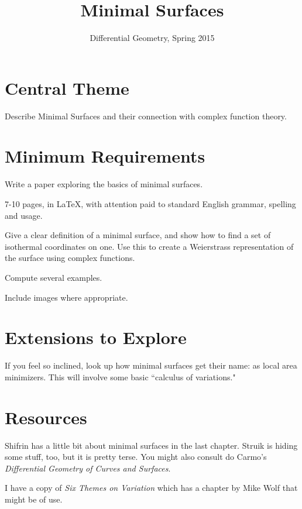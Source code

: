 \documentclass[12pt]{amsart}
\begin{document}
\title{Minimal Surfaces}
\author{Differential Geometry, Spring 2015}

\maketitle

\section*{Central Theme}

Describe Minimal Surfaces and their connection with complex function theory.

\section*{Minimum Requirements}

Write a paper exploring the basics of minimal surfaces. 
\begin{compactitem}
\item 7-10 pages, in \LaTeX, with attention paid to standard English grammar, spelling and usage.
\item Give a clear definition of a minimal surface, and show how to find a set of isothermal coordinates on one. Use this to create a Weierstrass representation of the surface using complex functions.
\item Compute several examples.
\item Include images where appropriate.
\end{compactitem}


\section*{Extensions to Explore}

If you feel so inclined, look up how minimal surfaces get their name: as local area minimizers. This will involve some basic ``calculus of variations."

\section*{Resources}

Shifrin has a little bit about minimal surfaces in the last chapter. Struik is hiding some stuff, too, but it is pretty terse. You might also consult do Carmo's \emph{Differential Geometry of Curves and Surfaces}.

I have a copy of \emph{Six Themes on Variation} which has a chapter by Mike Wolf that might be of use.
\end{document}

